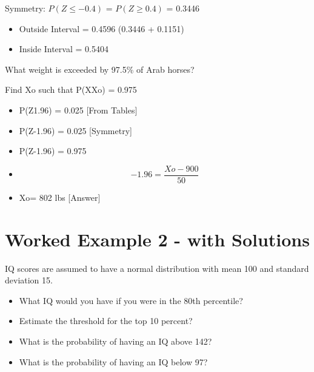\documentclass[]{report}
\begin{document}
Symmetry: 	$P(Z \leq -0.4)$ = $P(Z \geq 0.4)$ = 0.3446


\begin{itemize}
	\item Outside Interval = 0.4596        (0.3446 +  0.1151)
	\item Inside Interval = 0.5404
\end{itemize}



What weight is exceeded by 97.5\% of Arab horses?

Find Xo  such that P(XXo) = 0.975

\begin{itemize}
	\item 	P(Z1.96) = 0.025     [From Tables] 
	
	\item	P(Z-1.96) = 0.025  [Symmetry]
	
	\item	P(Z-1.96) = 0.975         
	
	\item	\[-1.96 = \frac{Xo- 900}{50} \]
	
	
	\item	Xo= 802 lbs  [Answer]
\end{itemize}	








\section{Worked Example 2 - with Solutions}
IQ scores are assumed to have a normal distribution with mean 100 and standard deviation 15.

\begin{itemize}
	\item What IQ would you have if you were in the 80th percentile?
	\item Estimate the threshold for the top 10 percent?
	\item What is the probability of having an IQ above 142?
	\item What is the probability of having an IQ below 97?
\end{itemize}


	
\end{document}
